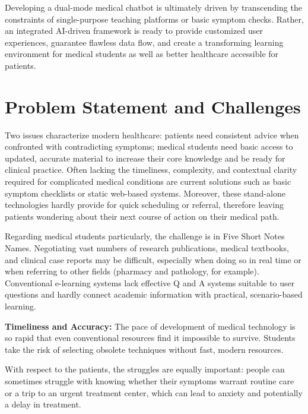 \noindent Developing a dual-mode medical chatbot is ultimately driven by transcending the constraints of single-purpose teaching platforms or basic symptom checks.  Rather, an integrated AI-driven framework is ready to provide customized user experiences, guarantee flawless data flow, and create a transforming learning environment for medical students as well as better healthcare accessible for patients.



\vspace{2cm}
\section{Problem Statement and Challenges}
\label{sec:problem-statement}
\sloppy

\noindent Two issues characterize modern healthcare: patients need consistent advice when confronted with contradicting symptoms; medical students need basic access to updated, accurate material to increase their core knowledge and be ready for clinical practice. Often lacking the timeliness, complexity, and contextual clarity required for complicated medical conditions are current solutions such as basic symptom checklists or static web-based systems. Moreover, these stand-alone technologies hardly provide for quick scheduling or referral, therefore leaving patients wondering about their next course of action on their medical path.

Regarding medical students particularly, the challenge is in Five Short Notes Names. Negotiating vast numbers of research publications, medical textbooks, and clinical case reports may be difficult, especially when doing so in real time or when referring to other fields (pharmacy and pathology, for example). Conventional e-learning systems lack effective Q and A systems suitable to user questions and hardly connect academic information with practical, scenario-based learning.

\noindent \textbf{Timeliness and Accuracy:} The pace of development of medical technology is so rapid that even conventional resources find it impossible to survive. Students take the risk of selecting obsolete techniques without fast, modern resources.

With respect to the patients, the struggles are equally important: people can sometimes struggle with knowing whether their symptoms warrant routine care or a trip to an urgent treatment center, which can lead to anxiety and potentially a delay in treatment.

